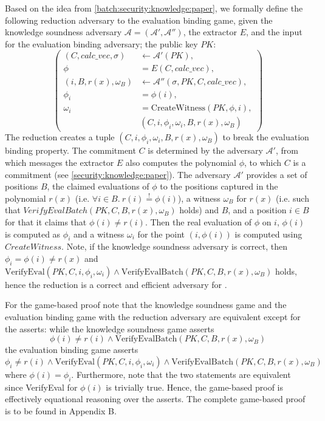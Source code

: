 Based on the idea from \ref{batch:security:knowledge:paper}, we formally define the following reduction adversary to the evaluation binding game, given the knowledge soundness adversary $\mathcal{A=(A',A'')}$, the extractor $E$, and the input for the evaluation binding adversary; the public key $PK$:
\begin{equation*}
    \left(
        \begin{aligned}
            (C,calc\_vec, \sigma) &\leftarrow \mathcal{A'}(PK), \\
            \phi &= E(C, calc\_vec),\\
            (i, B, r(x), \omega_B) &\leftarrow \mathcal{A''}(\sigma, PK, C, calc\_vec), \\
            \phi_i &= \phi(i), \\
            \omega_i &= \text{CreateWitness}(PK,\phi, i), \\
            &  (C, i, \phi_i, \omega_i, B, r(x), \omega_B)
        \end{aligned}
        \right)
\end{equation*}
The reduction creates a tuple $(C, i, \phi_i, \omega_i, B, r(x), \omega_B)$ to break the evaluation binding property. The commitment $C$ is determined by the adversary $\mathcal{A'}$, from which messages the extractor $E$ also computes the polynomial $\phi$, to which $C$ is a commitment (see \ref{security:knowledge:paper}). The adversary $\mathcal{A'}$ provides a set of positions $B$, the claimed evaluations of $\phi$ to the positions captured in the polynomial $r(x)$ (i.e. $\forall i\in B.\ r(i)\stackrel{!}{=}\phi(i)$), a witness $\omega_B$ for $r(x)$ (i.e. such that $VerifyEvalBatch(PK,C,B,r(x), \omega_B)$ holds) and $B$, and a position $i \in B$ for that it claims that $\phi(i) \ne r(i)$. Then the real evaluation of $\phi$ on $i$, $\phi(i)$ is computed as $\phi_i$ and a witness $\omega_i$ for the point $(i,\phi(i))$ is computed using $CreateWitness$.
Note, if the knowledge soundness adversary is correct, then $\phi_i=\phi(i)\ne r(x)$ and $\text{VerifyEval}(PK,C,i,\phi_i,\omega_i) \land \text{VerifyEvalBatch}(PK,C,B, r(x),\omega_B)$ holds, hence the reduction is a correct and efficient adversary for .

For the game-based proof note that the knowledge soundness game and the evaluation binding game with the reduction adversary are equivalent except for the asserts: while the knowledge soundness game asserts 
$$\phi(i) \ne r(i) \land \text{VerifyEvalBatch}(PK, C, B,r(x),\omega_B)$$ the evaluation binding game asserts 
$$\phi_i \ne r(i) \land \text{VerifyEval}(PK, C, i, \phi_i, \omega_i) \land \text{VerifyEvalBatch}(PK, C, B, r(x), \omega_B)$$ where $\phi(i)=\phi_i$. Furthermore, note that the two statements are equivalent since VerifyEval for $\phi(i)$ is trivially true. Hence, the game-based proof is effectively equational reasoning over the asserts. The complete game-based proof is to be found in Appendix B.

